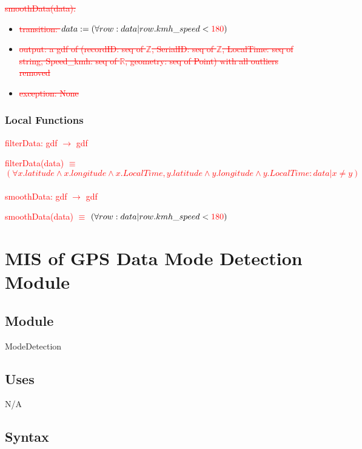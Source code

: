 \documentclass[12pt, titlepage]{article}
\begin{document}
\noindent \textcolor{red}{\sout{smoothData(data):}}
\begin{itemize}
\item \textcolor{red}{\sout{transition: $data := (\forall row : data | row.kmh\_speed < \textcolor{red}{180})$}}
\item \textcolor{red}{\sout{output: a gdf of (recordID: seq of $\mathbb{Z}$, SerialID: seq of $\mathbb{Z}$, LocalTime: seq of string, Speed\_kmh: seq of $\mathbb{R}$, geometry: seq of Point) with all outliers removed}}
\item\textcolor{red}{\sout{exception: None}} 
\end{itemize}

\subsubsection{Local Functions}
\noindent\textcolor{red}{filterData: gdf $\rightarrow$ gdf}

\noindent\textcolor{red}{filterData(data) $\equiv$ $(\forall x.latitude \wedge x.longitude \wedge x.LocalTime, y.latitude \wedge y.longitude \wedge y.LocalTime : data | x \neq y)$}
\\\\
\noindent \textcolor{red}{smoothData: gdf $\rightarrow$ gdf}

\noindent\textcolor{red}{smoothData(data) $\equiv$ $(\forall row : data | row.kmh\_speed < \textcolor{red}{180})$}

\newpage

\section{MIS of GPS Data Mode Detection Module} \label{ModeDetection} 

\subsection{Module}

ModeDetection

\subsection{Uses}

N/A

\subsection{Syntax}
\end{document}
